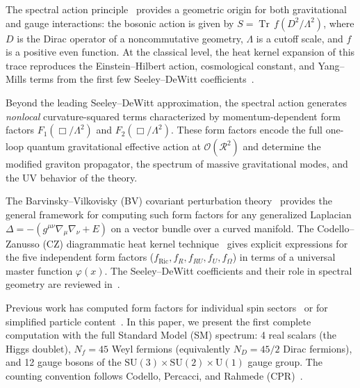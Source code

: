 \documentclass[aps,prd,twocolumn,superscriptaddress,nofootinbib,floatfix]{revtex4-2}
\newcommand{\Tr}{\operatorname{Tr}}
\begin{document}
The spectral action principle~\cite{Chamseddine:1996zu,Chamseddine:2006ep}
provides a geometric origin for both gravitational and gauge interactions:
the bosonic action is given by $S = \Tr\,f(D^2/\Lambda^2)$, where $D$ is the
Dirac operator of a noncommutative geometry, $\Lambda$ is a cutoff scale, and
$f$ is a positive even function. At the classical level, the heat kernel
expansion of this trace reproduces the Einstein--Hilbert action, cosmological
constant, and Yang--Mills terms from the first few Seeley--DeWitt
coefficients~\cite{Chamseddine:2010ud,vanSuijlekom:2014pya}.

Beyond the leading Seeley--DeWitt approximation, the spectral action generates
\emph{nonlocal} curvature-squared terms characterized by momentum-dependent
form factors $F_1(\Box/\Lambda^2)$ and $F_2(\Box/\Lambda^2)$. These form
factors encode the full one-loop quantum gravitational effective action at
$\mathcal{O}(\mathcal{R}^2)$ and determine the modified graviton propagator,
the spectrum of massive gravitational modes, and the UV behavior of the theory.

The Barvinsky--Vilkovisky (BV) covariant perturbation
theory~\cite{Barvinsky:1985an,Barvinsky:1987uw} provides the general framework
for computing such form factors for any generalized Laplacian
$\Delta = -(g^{\mu\nu}\nabla_\mu\nabla_\nu + E)$ on a vector bundle over a
curved manifold. The Codello--Zanusso (CZ) diagrammatic heat kernel
technique~\cite{Codello:2012kq} gives explicit expressions for the five
independent form factors ($f_{\text{Ric}}, f_R, f_{RU}, f_U, f_\Omega$) in
terms of a universal master function $\varphi(x)$. The Seeley--DeWitt
coefficients and their role in spectral geometry are reviewed
in~\cite{DeWitt:1964mxt,Gilkey:1975iq,Vassilevich:2003xt,Avramidi:2000bm,Fursaev:2011zz}.

Previous work has computed form factors for individual spin
sectors~\cite{Barvinsky:1987uw,Codello:2012kq} or for simplified particle
content~\cite{Codello:2008vh}. In this paper, we present the first complete
computation with the full Standard Model (SM) spectrum: 4 real scalars (the
Higgs doublet), $N_f = 45$ Weyl fermions (equivalently $N_D = 45/2$ Dirac
fermions), and 12 gauge bosons of the $\mathrm{SU}(3) \times \mathrm{SU}(2)
\times \mathrm{U}(1)$ gauge group. The counting convention follows
Codello, Percacci, and Rahmede (CPR)~\cite{Codello:2008vh}.
\end{document}
